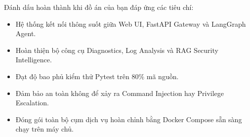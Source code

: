 \begin{checkpointbox}
Đánh dấu hoàn thành khi đồ án của bạn đáp ứng các tiêu chí:
\begin{itemize}
  \item[$\square$] Hệ thống kết nối thông suốt giữa Web UI, FastAPI Gateway và LangGraph Agent.
  \item[$\square$] Hoàn thiện bộ công cụ Diagnostics, Log Analysis và RAG Security Intelligence.
  \item[$\square$] Đạt độ bao phủ kiểm thử Pytest trên $80\%$ mã nguồn.
  \item[$\square$] Đảm bảo an toàn không để xảy ra Command Injection hay Privilege Escalation.
  \item[$\square$] Đóng gói toàn bộ cụm dịch vụ hoàn chỉnh bằng Docker Compose sẵn sàng chạy trên máy chủ.
\end{itemize}
\end{checkpointbox}

